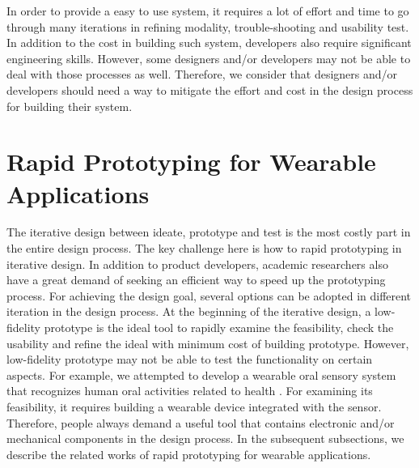 In order to provide a easy to use system, it requires a lot of effort and time to go through many iterations in refining modality, trouble-shooting and usability test.
In addition to the cost in building such system, developers also require significant engineering skills. However, some designers and/or developers may not be able to deal with those processes as well. Therefore, we consider that designers and/or developers should need a way to mitigate the effort and cost in the design process for building their system.

\section{Rapid Prototyping for Wearable Applications}
The iterative design \cite{Nielsen:1993:IUD:618985.619982, tripp1990rapid, van2007design} between ideate, prototype and test is the most costly part in the entire design process.
The key challenge here is how to rapid prototyping in iterative design. In addition to product developers, academic researchers also have a great demand of seeking an efficient way to speed up the prototyping process. For achieving the design goal, several options can be adopted in different iteration in the design process. At the beginning of the iterative design, a low-fidelity prototype \cite{walker2002high} is the ideal tool to rapidly examine the feasibility, check the usability and refine the ideal with minimum cost of building prototype. However, low-fidelity prototype may not be able to test the functionality on certain aspects. For example, we attempted to develop a wearable oral sensory system that recognizes human oral activities related to health \cite{Li2013teeth}. For examining its feasibility, it requires building a wearable device integrated with the sensor. Therefore, people always demand a useful tool that contains electronic and/or mechanical components in the design process. In the subsequent subsections, we describe the related works of rapid prototyping for wearable applications.



